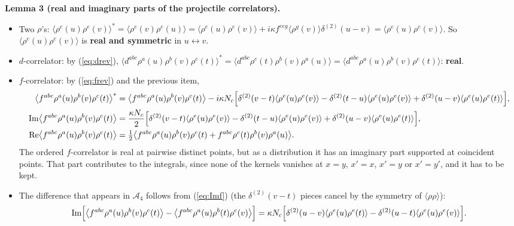 \documentclass[10pt]{article}
\begin{document}
\medskip\noindent\textbf{Lemma 3 (real and imaginary parts of the projectile correlators).}
\begin{itemize}
\item Two $\rho$'s: $\langle\rho^{e}(u)\rho^{e}(v)\rangle^{*}=\langle\rho^{e}(v)\rho^{e}(u)\rangle=\langle\rho^{e}(u)\rho^{e}(v)\rangle+i\kappa f^{eeg}\langle\rho^{g}(v)\rangle\delta^{(2)}(u-v)=\langle\rho^{e}(u)\rho^{e}(v)\rangle$. So $\langle\rho^{e}(u)\rho^{e}(v)\rangle$ is \textbf{real and symmetric} in $u\leftrightarrow v$.
\item $d$-correlator: by (\ref{eq:drev}), $\langle d^{abc}\rho^{a}(u)\rho^{b}(v)\rho^{c}(t)\rangle^{*}=\langle d^{abc}\rho^{c}(t)\rho^{b}(v)\rho^{a}(u)\rangle=\langle d^{abc}\rho^{a}(u)\rho^{b}(v)\rho^{c}(t)\rangle$: \textbf{real}.
\item $f$-correlator: by (\ref{eq:frev}) and the previous item,
\begin{align}
\big\langle f^{abc}\rho^{a}(u)\rho^{b}(v)\rho^{c}(t)\big\rangle^{*}&=\big\langle f^{abc}\rho^{a}(u)\rho^{b}(v)\rho^{c}(t)\big\rangle-i\kappa N_{c}\Big[\delta^{(2)}(v-t)\langle\rho^{e}(u)\rho^{e}(v)\rangle-\delta^{(2)}(t-u)\langle\rho^{e}(u)\rho^{e}(v)\rangle+\delta^{(2)}(u-v)\langle\rho^{e}(u)\rho^{e}(t)\rangle\Big],\notag\\
{\rm Im}\big\langle f^{abc}\rho^{a}(u)\rho^{b}(v)\rho^{c}(t)\big\rangle&=\frac{\kappa N_{c}}{2}\Big[\delta^{(2)}(v-t)\langle\rho^{e}(u)\rho^{e}(v)\rangle-\delta^{(2)}(t-u)\langle\rho^{e}(u)\rho^{e}(v)\rangle+\delta^{(2)}(u-v)\langle\rho^{e}(u)\rho^{e}(t)\rangle\Big],\label{eq:Imf}\\
{\rm Re}\big\langle f^{abc}\rho^{a}(u)\rho^{b}(v)\rho^{c}(t)\big\rangle&=\tfrac12\big\langle f^{abc}\rho^{a}(u)\rho^{b}(v)\rho^{c}(t)+f^{abc}\rho^{c}(t)\rho^{b}(v)\rho^{a}(u)\big\rangle .\notag
\end{align}
The ordered $f$-correlator is real at pairwise distinct points, but as a distribution it has an imaginary part supported at coincident points. That part contributes to the integrals, since none of the kernels vanishes at $x=y$, $x'=x$, $x'=y$ or $x'=y'$, and it has to be kept.
\item The difference that appears in $\mathcal{A}_{4}$ follows from (\ref{eq:Imf}) (the $\delta^{(2)}(v-t)$ pieces cancel by the symmetry of $\langle\rho\rho\rangle$):
\begin{equation}
{\rm Im}\Big[\big\langle f^{abc}\rho^{a}(u)\rho^{b}(v)\rho^{c}(t)\big\rangle-\big\langle f^{abc}\rho^{a}(u)\rho^{b}(t)\rho^{c}(v)\big\rangle\Big]=\kappa N_{c}\Big[\delta^{(2)}(u-v)\langle\rho^{e}(u)\rho^{e}(t)\rangle-\delta^{(2)}(u-t)\langle\rho^{e}(u)\rho^{e}(v)\rangle\Big].\label{eq:Imf4}
\end{equation}
\end{itemize}
\end{document}
